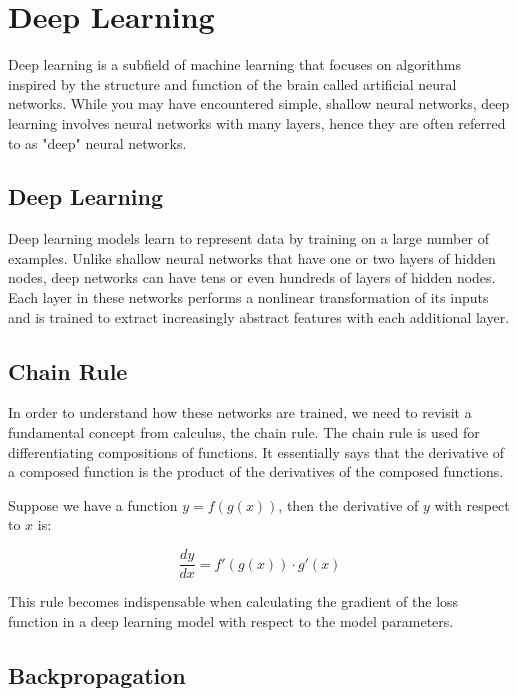 \chapter{Deep Learning}

Deep learning is a subfield of machine learning that focuses on
algorithms inspired by the structure and function of the brain called
artificial neural networks. While you may have encountered simple,
shallow neural networks, deep learning involves neural networks with
many layers, hence they are often referred to as "deep" neural
networks.

\section{Deep Learning}

Deep learning models learn to represent data by training on a large
number of examples. Unlike shallow neural networks that have one or
two layers of hidden nodes, deep networks can have tens or even
hundreds of layers of hidden nodes. Each layer in these networks
performs a nonlinear transformation of its inputs and is trained to
extract increasingly abstract features with each additional layer.

\section{Chain Rule}

In order to understand how these networks are trained, we need to
revisit a fundamental concept from calculus, the chain rule. The chain
rule is used for differentiating compositions of functions. It
essentially says that the derivative of a composed function is the
product of the derivatives of the composed functions.

Suppose we have a function $y = f(g(x))$, then the derivative of $y$
with respect to $x$ is:

\begin{equation}
\frac{dy}{dx} = f'(g(x)) \cdot g'(x)
\end{equation}

This rule becomes indispensable when calculating the gradient of the
loss function in a deep learning model with respect to the model
parameters.

\section{Backpropagation}

